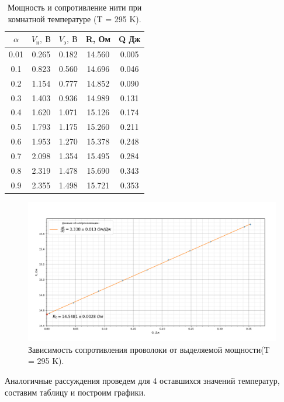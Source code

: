 \documentclass[a4paper, 12pt]{article}%
\begin{document}
	\begin{table}[H]
		\centering
		\begin{tabular}{|c|c|c|c|c|}
			\hline
			$\alpha$ & $V_{н}, ~ В$ & $V_{э}, ~ В$ & R, Ом & Q Дж \\ \hline
			0.01  & 0.265   & 0.182     & 14.560  & 0.005      \\ \hline
			0.1   & 0.823   & 0.560     & 14.696  & 0.046      \\ \hline
			0.2   & 1.154   & 0.777     & 14.852  & 0.090      \\ \hline
			0.3   & 1.403   & 0.936     & 14.989  & 0.131      \\ \hline
			0.4   & 1.620   & 1.071     & 15.126  & 0.174      \\ \hline
			0.5   & 1.793   & 1.175     & 15.260  & 0.211      \\ \hline
			0.6   & 1.953   & 1.270     & 15.378  & 0.248      \\ \hline
			0.7   & 2.098   & 1.354     & 15.495  & 0.284      \\ \hline
			0.8   & 2.319   & 1.478     & 15.690  & 0.343      \\ \hline
			0.9   & 2.355   & 1.498     & 15.721  & 0.353      \\ \hline
		\end{tabular}
		\caption{Мощность и сопротивление нити при комнатной температуре (T = 295 K).}
	\end{table}
	\begin{figure}[H]
		\centering
		\includegraphics[width=0.8\linewidth]{22_grad}
		\caption{Зависимость сопротивления проволоки от выделяемой мощности(T = 295 K).}
		\label{fig:22grad}
	\end{figure}
	Аналогичные рассуждения проведем для 4 оставшихся значений температур, составим таблицу и построим графики.
\end{document}
